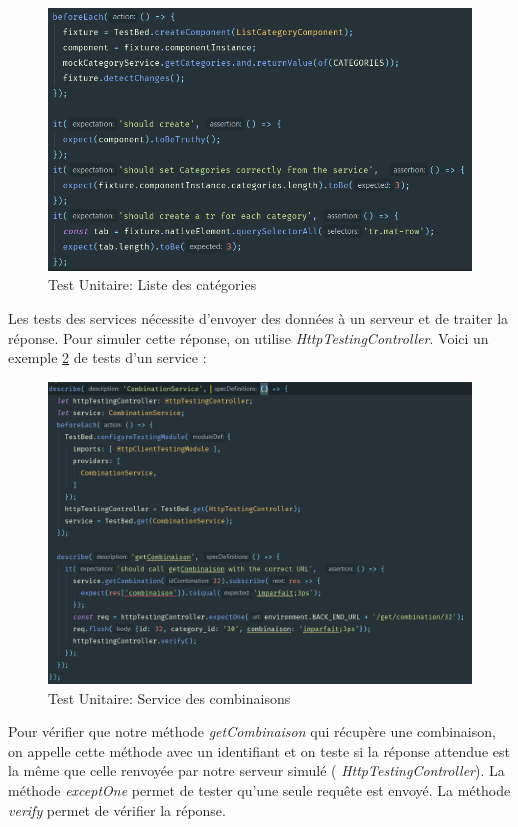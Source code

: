\documentclass[12pt,a4paper]{article}
\begin{document}
\begin{figure}[h]
\centering
\includegraphics[width=170mm]{img/testlistcategory.PNG}
\caption{Test Unitaire: Liste des catégories}
\label{ListCategory}
\end{figure}

Les tests des services nécessite d'envoyer des données à un serveur et de traiter la réponse.
Pour simuler cette réponse, on utilise \textit{HttpTestingController}.
Voici un exemple \ref{ServiceCombin} de tests d'un service : \newline
\begin{figure}[h]
\centering
\includegraphics[width=170mm]{img/serviceCombinaison.PNG}
\caption{Test Unitaire: Service des combinaisons}
\label{ServiceCombin}
\end{figure}
 
 \newpage
Pour vérifier que notre méthode \textit{getCombinaison} qui récupère une combinaison, on appelle cette méthode avec un identifiant et on teste si la réponse attendue est la même que celle renvoyée par notre serveur simulé (  \textit{HttpTestingController}).
La méthode \textit{exceptOne} permet de tester qu'une seule requête est envoyé.
La méthode \textit{verify} permet de vérifier la réponse. \newline
\end{document}
